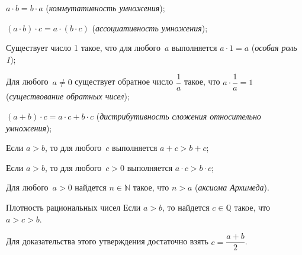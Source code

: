 \begin{properties}[resume]
\item \(a \cdot b = b \cdot a\) (\textit{коммутативность умножения});
\item \((a \cdot b) \cdot c = a \cdot (b \cdot c)\) (\textit{ассоциативность умножения});
\item Существует число 1 такое, что для любого~\(a\) выполняется \(a \cdot 1 = a\) (\textit{особая
    роль 1});
\item Для любого~\(a \neq 0\) существует обратное число \(\dfrac{1}{a}\) такое, что \(a \cdot
    \dfrac{1}{a} = 1\) (\textit{существование обратных чисел});
\item \((a + b) \cdot c = a \cdot c + b \cdot c\) (\textit{дистрибутивность сложения относительно
    умножения});
\item Если \(a > b\), то для любого~\(c\) выполняется \(a + c > b + c\);
\item Если \(a > b\), то для любого~\(c > 0\) выполняется \(a \cdot c > b \cdot c\);
\item Для любого~\(a > 0\) найдется \(n \in \mathbb{N}\) такое, что \(n > a\) (\textit{аксиома
    Архимеда}).
\end{properties}

\begin{mtopic}{Плотность рациональных чисел}
Если \(a > b\), то найдется \(c \in \mathbb{Q}\) такое, что \(a > c > b\).

Для доказательства этого утверждения достаточно взять \(c = \dfrac{a + b}{2}\).
\end{mtopic}